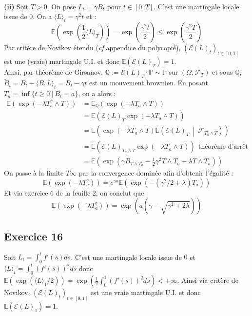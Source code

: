 \documentclass[a4paper,12pt]{article}
\newcommand{\E}{\mathbb{E}}
\newcommand{\prob}{\mathbb{P}}
\newcommand{\f}{\mathcal{F}}
\newcommand{\sme}{\mathcal{E}}
\begin{document}
\textbf{(ii)} Soit $T>0$. On pose $L_t = \gamma B_t$ pour $t \in [0,T]$. C'est une martingale locale issue de $0$. On a $\langle L \rangle_t = \gamma^2 t$ et :
$$\E \left( \exp{ \left( \frac{1}{2} \langle L \rangle_T \right) } \right) = \exp{\left( \frac{\gamma^2 t}{2} \right)} \leq \exp{\left( \frac{\gamma^2 T}{2} \right) }$$
Par critère de Novikov étendu (\textit{cf} appendice du polycopié), $(\sme(L)_t)_{t \in [0,T]}$ est une (vraie) martingale U.I. et donc $\E (\sme (L)_T)=1$. \\

Ainsi, par théorème de Girsanov, $\mathbb{Q} := \sme (L)_T \cdot \prob \sim \prob$ sur $(\Omega, \f_T)$ et sous $\mathbb{Q}$, $\tilde{B}_t =B_t - \langle B,L \rangle_t = B_t - \gamma t$ est un mouvement brownien. En posant $T_a = \inf \{ t \geq 0 \ | \ B_t=a \}$, on a alors :
\begin{align*}
\E \left( \exp{\left( - \lambda T_a^{\gamma } \wedge T \right)} \right) & = \E_{\mathbb{Q}} \left( \exp{\left( - \lambda T_a \wedge T \right)} \right) \\
& = \E \left( \sme (L)_T \exp{\left( -\lambda T_a \wedge T \right)} \right) \\
& = \E \left(\exp{\left( -\lambda T_a \wedge T \right)} \E \left( \sme (L)_T \ \middle| \ \f_{T_a \wedge T} \right) \right) \\
& = \E \left( \sme (L)_{T_a \wedge T} \exp{\left( -\lambda T_a \wedge T \right)} \right) \ \ \text{théorème d'arrêt} \\
& = \E \left( \exp{\left( \gamma B_{T \wedge T_a} - \frac{1}{2} \gamma^2 T \wedge T_a - \lambda T \wedge T_a \right)} \right)
\end{align*}
On passe à la limite $T \infty$ par la convergence dominée afin d'obtenir l'égalité :
$$\E \left( \exp{\left( - \lambda T_a^{\gamma} \right)} \right) = e^{\gamma a} \E \left( \exp{\left( -(\gamma^2/2+\lambda)T_a \right)} \right)$$
Et via exercice 6 de la feuille 2, on conclut que :
$$\E \left( \exp{\left( - \lambda T_a^{\gamma} \right)} \right) = \exp{\left( a(\gamma - \sqrt{\gamma^2 + 2 \lambda}) \right)}$$

\subsection{Exercice 16}
Soit $L_t=\int_0^t f'(s) ds$. C'est une martingale locale issue de $0$ et $\langle L \rangle_t = \int_0^t (f'(s))^2 ds$ donc $\E(\exp{(\langle L \rangle_1 /2)})=\exp{\left( \frac{1}{2} \int_0^1 (f'(s))^2 ds \right)}< + \infty$. Ainsi via critère de Novikov, $(\sme (L)_t)_{t \in [0,1]}$ est une vraie martingale U.I. et donc $\E \left( \sme(L)_1 \right) = 1$. \\
\end{document}
